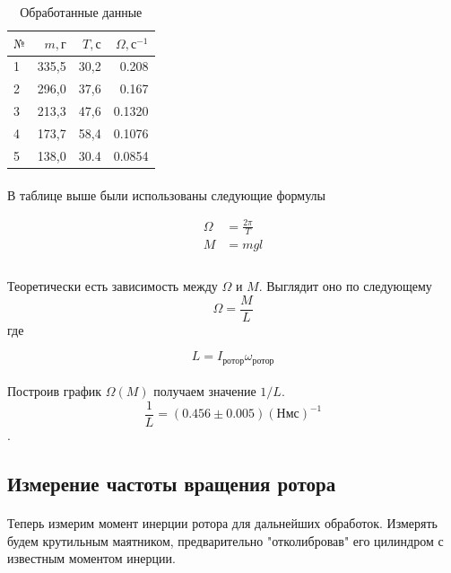 \documentclass[a4paper, 12pt]{article}
\begin{document}
    \begin{table}[h!]
        \begin{center}
        \begin{tabular}{|l|r|r|r|}
        \hline
        $№$ & $m, г$ &   $T, с$ & $\Omega, с^{-1}$ \\\hline
        1 &  335,5 &  30,2 &   0.208 \\
        2 &  296,0 &  37,6 &   0.167 \\
        3 &  213,3 &  47,6 &   0.1320 \\
        4 &  173,7 &  58,4 &   0.1076  \\
        5 &  138,0 &  30.4 &   0.0854  \\
        \hline
        \end{tabular}
         \caption{Обработанные данные}
        \end{center}

    \end{table}
    \paragraph{}
    В таблице выше были использованы следующие формулы

    \begin{align*}
     \Omega &= \frac{2\pi}{T}\\
     M &= mgl\\
    \end{align*}

    \paragraph{}
    Теоретически есть зависимость между $\Omega$ и $M$. Выглядит оно по следующему
    \[\Omega = \frac{M}{L}\]
    где
    
    \[L = I_{ротор}\omega_{ротор}\]
    \paragraph{}
    Построив график $\Omega(M)$ получаем значение $1/L$.
    \[\frac{1}{L}=(0.456 \pm 0.005)(Нмс)^{-1}\].
    \subsection{Измерение частоты вращения ротора}

    \paragraph{}
    Теперь измерим момент инерции ротора для дальнейших обработок. Измерять будем крутильным маятником, предварительно "отколибровав" его цилиндром с известным моментом инерции.
\end{document}
